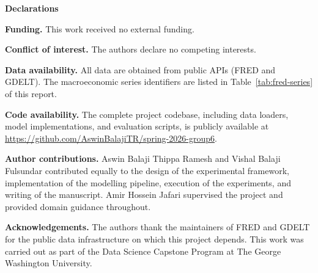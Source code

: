 \documentclass[12pt,a4paper]{article}
\begin{document}
\newpage
\thispagestyle{empty}
\vspace*{2cm}
\begin{center}
  {\Large\bfseries\color{gwublue} Declarations}
\end{center}
\vspace{1cm}
\noindent\textbf{Funding.} This work received no external funding.

\noindent\textbf{Conflict of interest.} The authors declare no competing interests.

\noindent\textbf{Data availability.} All data are obtained from public APIs (FRED and GDELT). The macroeconomic series identifiers are listed in Table~\ref{tab:fred-series} of this report.

\noindent\textbf{Code availability.} The complete project codebase, including data loaders, model implementations, and evaluation scripts, is publicly available at \url{https://github.com/AswinBalajiTR/spring-2026-group6}.

\noindent\textbf{Author contributions.}
Aswin Balaji Thippa Ramesh and Vishal Balaji Fulsundar contributed equally to the design of the experimental framework, implementation of the modelling pipeline, execution of the experiments, and writing of the manuscript. Amir Hossein Jafari supervised the project and provided domain guidance throughout.

\noindent\textbf{Acknowledgements.}
The authors thank the maintainers of FRED and GDELT for the public data infrastructure on which this project depends. This work was carried out as part of the Data Science Capstone Program at The George Washington University.
\end{document}
